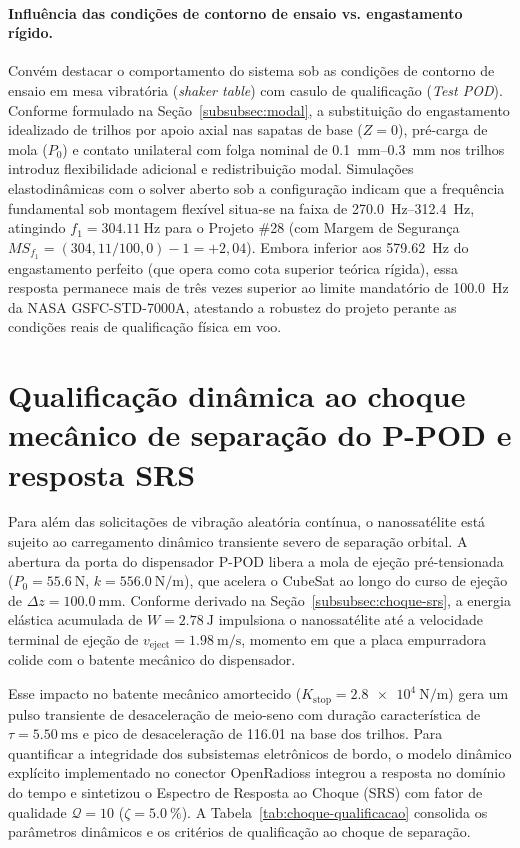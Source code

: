 \paragraph*{Influência das condições de contorno de ensaio vs. engastamento rígido.}
Convém destacar o comportamento do sistema sob as condições de contorno de ensaio em mesa vibratória (\textit{shaker table}) com casulo de qualificação (\textit{Test POD}). Conforme formulado na Seção~\ref{subsubsec:modal}, a substituição do engastamento idealizado de trilhos por apoio axial nas sapatas de base ($Z = 0$), pré-carga de mola ($P_0$) e contato unilateral com folga nominal de \SIrange{0.1}{0.3}{\milli\metre} nos trilhos introduz flexibilidade adicional e redistribuição modal. Simulações elastodinâmicas com o solver aberto sob a configuração  indicam que a frequência fundamental sob montagem flexível situa-se na faixa de \SIrange{270.0}{312.4}{\hertz}, atingindo $f_1 = \SI{304.11}{\hertz}$ para o Projeto \#28 (com Margem de Segurança $MS_{f_1} = (304{,}11 / 100{,}0) - 1 = +2{,}04$). Embora inferior aos \SI{579.62}{\hertz} do engastamento perfeito (que opera como cota superior teórica rígida), essa resposta permanece mais de três vezes superior ao limite mandatório de \SI{100.0}{\hertz} da NASA GSFC-STD-7000A, atestando a robustez do projeto perante as condições reais de qualificação física em voo.

\section{Qualificação dinâmica ao choque mecânico de separação do P-POD e resposta SRS}
\label{sec:choque-srs}

Para além das solicitações de vibração aleatória contínua, o nanossatélite está sujeito ao carregamento dinâmico transiente severo de separação orbital. A abertura da porta do dispensador P-POD libera a mola de ejeção pré-tensionada ($P_0 = \SI{55.6}{\newton}$, $k = \SI{556.0}{\newton\per\metre}$), que acelera o CubeSat ao longo do curso de ejeção de $\Delta z = \SI{100.0}{\milli\metre}$. Conforme derivado na Seção~\ref{subsubsec:choque-srs}, a energia elástica acumulada de $W = \SI{2.78}{\joule}$ impulsiona o nanossatélite até a velocidade terminal de ejeção de $v_{\text{eject}} = \SI{1.98}{\metre\per\second}$, momento em que a placa empurradora colide com o batente mecânico do dispensador.

Esse impacto no batente mecânico amortecido ($K_{\text{stop}} = \SI{2.8e4}{\newton\per\metre}$) gera um pulso transiente de desaceleração de meio-seno com duração característica de $\tau = \SI{5.50}{\milli\second}$ e pico de desaceleração de \SI{116.01}{\gravity} na base dos trilhos. Para quantificar a integridade dos subsistemas eletrônicos de bordo, o modelo dinâmico explícito implementado no conector OpenRadioss integrou a resposta no domínio do tempo e sintetizou o Espectro de Resposta ao Choque (SRS) com fator de qualidade $\mathcal{Q} = 10$ ($\zeta = \SI{5.0}{\percent}$). A Tabela~\ref{tab:choque-qualificacao} consolida os parâmetros dinâmicos e os critérios de qualificação ao choque de separação.


